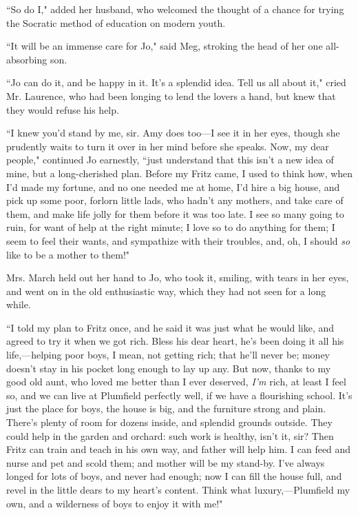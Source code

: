 ``So do I," added her husband, who welcomed the thought of a chance for
trying the Socratic method of education on modern youth.

``It will be an immense care for Jo," said Meg, stroking the head of her
one all-absorbing son.

``Jo can do it, and be happy in it. It's a splendid idea.
Tell us all about it," cried Mr. Laurence, who had been longing to lend
the lovers a hand, but knew that they would refuse his help.

``I knew you'd stand by me, sir. Amy does too---I see it
in her eyes, though she prudently waits to turn it over in her mind
before she speaks. Now, my dear people," continued Jo earnestly, ``just
understand that this isn't a new idea of mine, but a
long-cherished plan. Before my Fritz came, I used to think how, when
I'd made my fortune, and no one needed me at home,
I'd hire a big house, and pick up some poor, forlorn
little lads, who hadn't any mothers, and take care of
them, and make life jolly for them before it was too late. I see so many
going to ruin, for want of help at the right minute; I love so to do
anything for them; I seem to feel their wants, and sympathize with their
troubles, and, oh, I should \emph{so} like to be a mother to them!"

Mrs. March held out her hand to Jo, who took it, smiling, with tears in
her eyes, and went on in the old enthusiastic way, which they had not
seen for a long while.

``I told my plan to Fritz once, and he said it was just what he would
like, and agreed to try it when we got rich. Bless his dear heart,
he's been doing it all his life,---helping poor boys, I
mean, not getting rich; that he'll never be; money
doesn't stay in his pocket long enough to lay up any.
But now, thanks to my good old aunt, who loved me better than I ever
deserved, \emph{I'm} rich, at least I feel so, and we
can live at Plumfield perfectly well, if we have a flourishing school.
It's just the place for boys, the house is big, and the
furniture strong and plain. There's plenty of room for
dozens inside, and splendid grounds outside. They could help in the
garden and orchard: such work is healthy, isn't it, sir?
Then Fritz can train and teach in his own way, and father will help him.
I can feed and nurse and pet and scold them; and mother will be my
stand-by. I've always longed for lots of boys, and never
had enough; now I can fill the house full, and revel in the little dears
to my heart's content. Think what luxury,---Plumfield my
own, and a wilderness of boys to enjoy it with me!"

